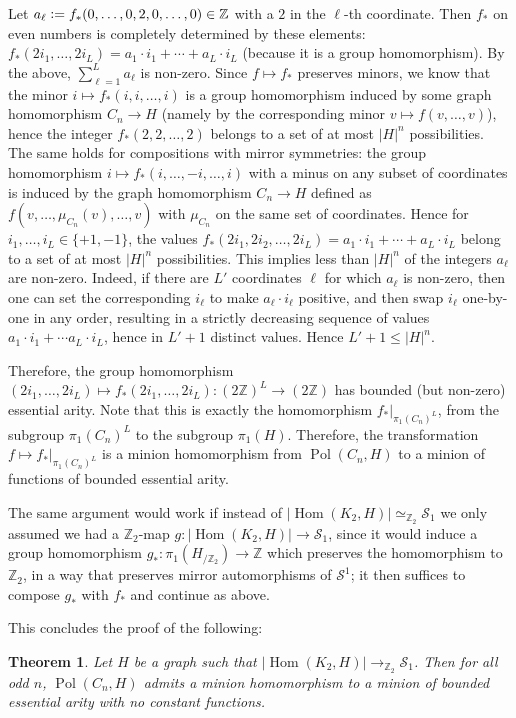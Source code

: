 \documentclass[11pt,a4paper]{scrartcl}
\newtheorem{theorem}{Theorem}
\numberwithin{theorem}{section}
\theoremstyle{definition}
\newcommand{\ZZ}{\mathbb{Z}}
\newcommand{\defeq}{\vcentcolon=}
\DeclareMathOperator{\Pol}{Pol}
\newcommand\Sphere{\mathcal{S}}
\DeclareMathOperator{\Hom}{Hom}
\newcommand{\zeq}{\simeq_{\ZZ_2}}
\begin{document}
Let $a_\ell \defeq f_*(0,\dots,0,2,0,\dots,0) \in  \ZZ$ with a $2$ in the $\ell$-th coordinate.
Then $f_*$ on even numbers is completely determined by these elements: $f_*(2i_1,\dots,2i_L) = a_1 \cdot {i_1} + \cdots + a_L \cdot i_L$ (because it is a group homomorphism).
By the above, $\sum_{\ell=1}^L a_\ell$ is non-zero.
Since $f \mapsto f_*$ preserves minors, 
we know that the minor $i \mapsto f_*(i,i,\dots,i)$ is a group homomorphism induced by some graph homomorphism $C_n \to H$ (namely by the corresponding minor $v \mapsto f(v,\dots,v)$), hence the integer $f_*(2,2,\dots,2)$ belongs to a set of at most $|H|^n$ possibilities.
The same holds for compositions with mirror symmetries:
the group homomorphism $i \mapsto f_*(i,\dots, -i, \dots,i)$ with a minus on any subset of coordinates is 
induced by the graph homomorphism $C_n \to H$ defined as
$f(v,\dots,\mu_{C_n}(v),\dots,v)$ with $\mu_{C_n}$ on the same set of coordinates.
Hence for $i_1,\dots,i_L \in \{+1,-1\}$, the values $f_*(2 i_1,2 i_2,\dots,2 i_L) = a_1 \cdot i_1 + \cdots + a_L \cdot i_L$ belong to a set of at most $|H|^n$ possibilities.
This implies less than $|H|^n$ of the integers $a_\ell$ are non-zero.
Indeed, if there are $L'$ coordinates $\ell$ for which $a_\ell$ is non-zero, then one can set the corresponding $i_\ell$ to make $a_\ell \cdot i_\ell$ positive, and then swap $i_\ell$ one-by-one in any order, resulting in a strictly decreasing sequence of values $a_1 \cdot i_1 + \cdots a_L \cdot i_L$, hence in $L'+1$ distinct values.
Hence $L'+1 \leq |H|^n$.

Therefore, the group homomorphism $(2i_1,\dots,2i_L) \mapsto
f_*(2i_1,\dots,2i_L) \colon (2\ZZ)^L \to (2\ZZ)$ has bounded (but non-zero)
essential arity.
Note that this is exactly the homomorphism $f_*|_{\pi_1(C_n)^L}$, from the subgroup $\pi_1(C_n)^L$ to the subgroup $\pi_1(H)$.
Therefore, the transformation $f \mapsto f_*|_{\pi_1(C_n)^L}$ is a minion homomorphism from $\Pol(C_n,H)$ to a minion of functions of bounded essential arity.

The same argument would work if instead of $|\Hom(K_2,H)|\zeq \Sphere_1$ we only assumed we had a $\ZZ_2$-map $g\colon|\Hom(K_2,H)|\to \Sphere_1$,
since it would induce a group homomorphism $g_* \colon \pi_1(H_{/\ZZ_2}) \to \ZZ$ which preserves the homomorphism to $\ZZ_2$, in a way that preserves mirror automorphisms of $\Sphere^1$; it then suffices to compose $g_*$ with $f_*$ and continue as above.

This concludes the proof of the following:
\begin{theorem}
	Let $H$ be a graph such that $|\Hom(K_2,H)| \to_{\ZZ_2} \Sphere_1$.
	Then for all odd $n$, $\Pol(C_n,H)$ admits a minion homomorphism to a minion of bounded essential arity with no constant functions.
\end{theorem}
\end{document}
